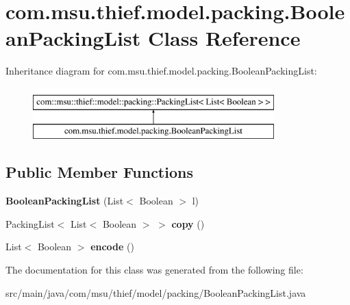 \hypertarget{classcom_1_1msu_1_1thief_1_1model_1_1packing_1_1BooleanPackingList}{\section{com.\-msu.\-thief.\-model.\-packing.\-Boolean\-Packing\-List Class Reference}
\label{classcom_1_1msu_1_1thief_1_1model_1_1packing_1_1BooleanPackingList}
}
Inheritance diagram for com.\-msu.\-thief.\-model.\-packing.\-Boolean\-Packing\-List\-:\begin{figure}[H]
\begin{center}
\leavevmode
\includegraphics[height=2.000000cm]{classcom_1_1msu_1_1thief_1_1model_1_1packing_1_1BooleanPackingList}
\end{center}
\end{figure}
\subsection*{Public Member Functions}
\begin{DoxyCompactItemize}
\item 
\hypertarget{classcom_1_1msu_1_1thief_1_1model_1_1packing_1_1BooleanPackingList_ab42916643e82ce81081a8509b610c04a}{{\bfseries Boolean\-Packing\-List} (List$<$ Boolean $>$ l)}\label{classcom_1_1msu_1_1thief_1_1model_1_1packing_1_1BooleanPackingList_ab42916643e82ce81081a8509b610c04a}

\item 
\hypertarget{classcom_1_1msu_1_1thief_1_1model_1_1packing_1_1BooleanPackingList_a2e563518fca44da6cf9b5a93ff4477c0}{Packing\-List$<$ List$<$ Boolean $>$ $>$ {\bfseries copy} ()}\label{classcom_1_1msu_1_1thief_1_1model_1_1packing_1_1BooleanPackingList_a2e563518fca44da6cf9b5a93ff4477c0}

\item 
\hypertarget{classcom_1_1msu_1_1thief_1_1model_1_1packing_1_1BooleanPackingList_a9e39b760237b78f02100fcf7fe6ccfda}{List$<$ Boolean $>$ {\bfseries encode} ()}\label{classcom_1_1msu_1_1thief_1_1model_1_1packing_1_1BooleanPackingList_a9e39b760237b78f02100fcf7fe6ccfda}

\end{DoxyCompactItemize}


The documentation for this class was generated from the following file\-:\begin{DoxyCompactItemize}
\item 
src/main/java/com/msu/thief/model/packing/Boolean\-Packing\-List.\-java\end{DoxyCompactItemize}
